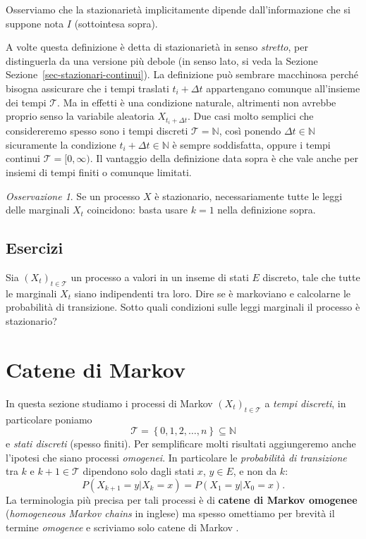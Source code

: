 \documentclass[
  italian,
  letterpaper,
]{book}
\newcommand{\cur}[1]{\left\{ #1 \right\}}
\theoremstyle{definition}
\theoremstyle{remark}
\newtheorem*{remark}{Osservazione}
\begin{document}
Osserviamo che la stazionarietà implicitamente dipende dall'informazione
che si suppone nota \(I\) (sottointesa sopra).

A volte questa definizione è detta di stazionarietà in senso
\emph{stretto}, per distinguerla da una versione più debole (in senso
lato, si veda la Sezione Sezione~\ref{sec-stazionari-continui}). La
definizione può sembrare macchinosa perché bisogna assicurare che i
tempi traslati \(t_i +\Delta t\) appartengano comunque all'insieme dei
tempi \(\mathcal{T}\). Ma in effetti è una condizione naturale,
altrimenti non avrebbe proprio senso la variabile aleatoria
\(X_{t_i+\Delta t}\). Due casi molto semplici che considereremo spesso
sono i tempi discreti \(\mathcal{T} = \mathbb{N}\), così ponendo
\(\Delta t \in \mathbb{N}\) sicuramente la condizione
\(t_i +\Delta t \in \mathbb{N}\) è sempre soddisfatta, oppure i tempi
continui \(\mathcal{T}= [0, \infty)\). Il vantaggio della definizione
data sopra è che vale anche per insiemi di tempi finiti o comunque
limitati.

\begin{remark}
Se un processo \(X\) è stazionario, necessariamente tutte le leggi delle
marginali \(X_t\) coincidono: basta usare \(k=1\) nella definizione
sopra.
\end{remark}

\subsection{Esercizi}\label{esercizi-33}

Sia \((X_t)_{t\in \mathcal{T}}\) un processo a valori in un inseme di
stati \(E\) discreto, tale che tutte le marginali \(X_t\) siano
indipendenti tra loro. Dire se è markoviano e calcolarne le probabilità
di transizione. Sotto quali condizioni sulle leggi marginali il processo
è stazionario?

\section{Catene di Markov}\label{sec-catene-markov}

In questa sezione studiamo i processi di Markov
\((X_t)_{t \in \mathcal{T}}\) a \emph{tempi discreti}, in particolare
poniamo \[\mathcal{T} = \cur{0,1,2,\ldots, n} \subseteq \mathbb{N}\] e
\emph{stati discreti} (spesso finiti). Per semplificare molti risultati
aggiungeremo anche l'ipotesi che siano processi \emph{omogenei}. In
particolare le \emph{probabilità di transizione} tra \(k\) e
\(k+1 \in \mathcal{T}\) dipendono solo dagli stati \(x\), \(y \in E\), e
non da \(k\): \[ P(X_{k+1} = y | X_k = x) =  P(X_{1} = y| X_0=x).\] La
terminologia più precisa per tali processi è di \textbf{catene di Markov
omogenee} (\emph{homogeneous Markov chains} in inglese) ma spesso
omettiamo per brevità il termine \emph{omogenee} e scriviamo solo catene
di Markov .
\end{document}
